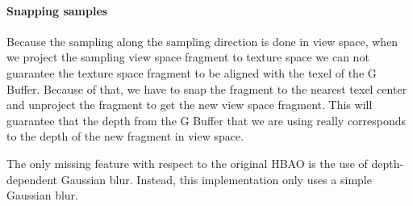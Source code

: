 \documentclass{article}
\begin{document}
\paragraph*{Snapping samples} Because the sampling along the sampling direction is done in view space, when we project the sampling view space fragment to texture space we can not guarantee the texture space fragment to be aligned with the texel of the G Buffer. Because of that, we have to snap the fragment to the nearest texel center and unproject the fragment to get the new view space fragment. This will guarantee that the depth from the G Buffer that we are using really corresponds to the depth of the new fragment in view space.

The only missing feature with respect to the original HBAO is the use of depth-dependent Gaussian blur. Instead, this implementation only uses a simple Gaussian blur.



\end{document}
